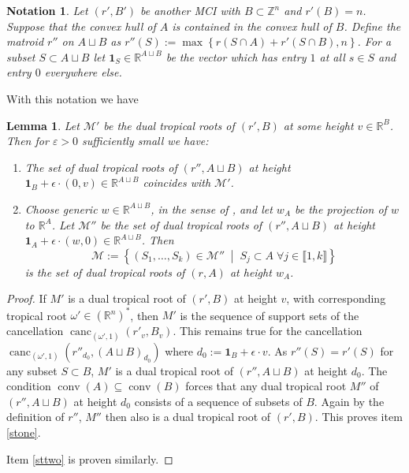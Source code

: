 \documentclass[a4paper]{article}
\newtheorem{lemma}{Lemma}
\newtheorem{notation}{Notation}
\theoremstyle{remark}
\newcommand{\set}[1]{\left\{#1\right\}}
\newcommand{\setdes}[2]{\left\{#1\;\middle|\;#2\right\}}
\def\RR{\mathbb{R}}
\def\ZZ{\mathbb{Z}}
\newcommand{\irng}[1]{\llbracket #1 \rrbracket}
\DeclareMathOperator{\canc}{canc}
\begin{document}
\begin{notation}
  \label{not:startsystem}
  Let $(r',B')$ be another MCI with $B\subset \ZZ^n$ and $r'(B) = n$. Suppose
  that the convex hull of $A$ is contained in the convex hull of $B$.
  Define the matroid $r''$ on $A\sqcup B$ as $r''(S) := \max\set{r(S\cap A) + r'(S\cap B),n}$.
  For a subset $S\subset A\sqcup B$ let $\mathbf{1}_S\in \RR^{A\sqcup B}$ be the vector which
  has entry $1$ at all $s\in S$ and entry $0$ everywhere else.
\end{notation}

With this notation we have
\begin{lemma}
  \label{lem:startsystem}
  Let $\mathcal{M}'$ be the dual tropical roots of $(r',B)$ at some height
  $v\in \RR^{B}$. Then for $\varepsilon > 0$ sufficiently small we have:
  \begin{enumerate}
  \item \label{stone} The set of dual tropical roots of $(r'',A\sqcup B)$ at height
    $\mathbf{1}_B + \epsilon \cdot (0,v)\in \RR^{A\sqcup B}$ coincides with $\mathcal{M}'$.
  \item \label{sttwo} Choose generic $w\in \RR^{A\sqcup B}$, in the sense of
    , and let $w_A$ be the projection of $w$ to
    $\RR^A$. Let $\mathcal{M}''$ be the set of dual tropical roots of
    $(r'',A\sqcup B)$ at height
    $\mathbf{1}_A + \epsilon \cdot (w,0)\in \RR^{A\sqcup B}$. Then
    \[\mathcal{M}:=\setdes{(S_1,\dots,S_k)\in \mathcal{M}''}{S_j\subset A\;\forall j\in \irng{1,k}}\]
    is the set of dual tropical roots of $(r,A)$ at height $w_A$.
  \end{enumerate}
\end{lemma}
\begin{proof}
  If $M'$ is a dual tropical root of
  $(r', B)$ at height $v$, with corresponding tropical root
  $\omega'\in (\RR^n)^{*}$, then $M'$ is the sequence of
  support sets of the cancellation $\canc_{(\omega',1)}(r'_v,B_v)$. This
  remains true for the cancellation
  $\canc_{(\omega',1)}(r''_{d_0},(A\sqcup B)_{d_0})$ where
  $d_0 := \mathbf{1}_B + \epsilon \cdot v$. As $r''(S) = r'(S)$ for any subset
  $S\subset B$, $M'$ is a dual tropical root of $(r'',A\sqcup B)$ at height
  $d_0$. The condition $\operatorname{conv}(A)\subseteq \operatorname{conv}(B)$ forces that any dual
  tropical root $M''$ of $(r'',A\sqcup B)$ at height $d_0$ consists of a sequence
  of subsets of $B$. Again by the definition of $r''$, $M''$ then also is
  a dual tropical root of $(r',B)$. This proves item \ref{stone}.

  Item \ref{sttwo} is proven similarly.
\end{proof}
\end{document}
